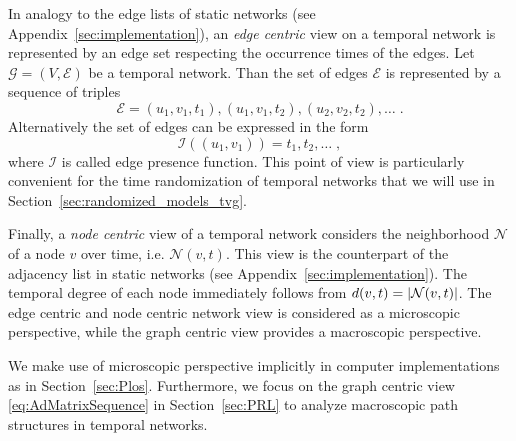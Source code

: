 In analogy to the edge lists of static networks (see Appendix~\ref{sec:implementation}), an \emph{edge centric} view on a temporal network is represented by an edge set respecting the occurrence times of the edges.
Let $\mathcal{G}=(V,\mathcal{E})$ be a temporal network.
Than the set of edges $\mathcal{E}$ is represented by a sequence of triples
\begin{equation*}%
\mathcal{E}=(u_1,v_1,t_1),(u_1,v_1,t_2),(u_2,v_2,t_2),\dots \;.
\end{equation*}
Alternatively the set of edges can be expressed in the form
\[
\mathcal{I}((u_1,v_1))=t_1,t_2,\dots \; ,
\]
where $\mathcal{I}$ is called edge presence function.
This point of view is particularly convenient for the time randomization of temporal networks that we will use in Section~\ref{sec:randomized_models_tvg}.

Finally, a \emph{node centric} view of a temporal network considers the neighborhood $\mathcal{N}$ of a node $v$ over time, i.e. $\mathcal{N}(v,t)$.
This view is the counterpart of the adjacency list in static networks (see Appendix~\ref{sec:implementation}).
The temporal degree of each node immediately follows from $d(v,t)=\left| \mathcal{N}(v,t) \right|$.
The edge centric and node centric network view is considered as a microscopic perspective, while the graph centric view provides a macroscopic perspective.

We make use of microscopic perspective implicitly in computer implementations as in Section~\ref{sec:Plos}.
Furthermore, we focus on the graph centric view \eqref{eq:AdMatrixSequence} in Section~\ref{sec:PRL} to analyze macroscopic path structures in temporal networks.

